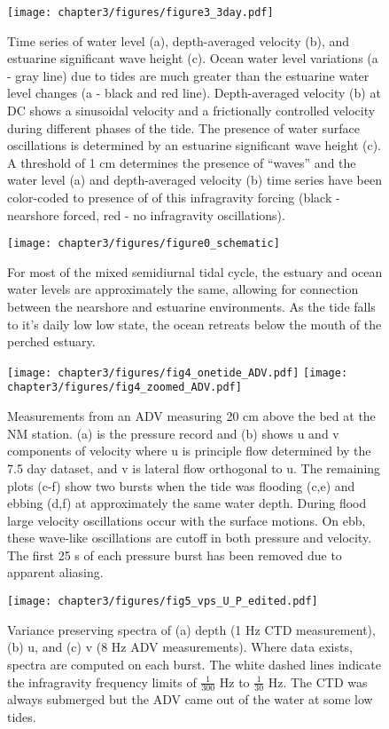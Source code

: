 \begin{figure}
\texttt{[image: chapter3/figures/figure3\_3day.pdf]}

\protect\caption{Time series of water level (a), depth-averaged velocity (b), and estuarine
significant wave height (c). Ocean water level variations (a - gray
line) due to tides are much greater than the estuarine water level
changes (a - black and red line). Depth-averaged velocity (b) at DC
shows a sinusoidal velocity and a frictionally controlled velocity
during different phases of the tide. The presence of water surface
oscillations is determined by an estuarine significant wave height
(c). A threshold of 1 cm determines the presence of ``waves'' and
the water level (a) and depth-averaged velocity (b) time series have
been color-coded to presence of of this infragravity forcing (black
- nearshore forced, red - no infragravity oscillations). \label{f3_HUHse}}
\end{figure}


\begin{figure}
\texttt{[image: chapter3/figures/figure0\_schematic]}

\protect\caption{For most of the mixed semidiurnal tidal cycle, the estuary and ocean
water levels are approximately the same, allowing for connection between
the nearshore and estuarine environments. As the tide falls to it's
daily low low state, the ocean retreats below the mouth of the perched
estuary.\label{f4_wl_schematic}}
\end{figure}

\begin{figure}
\texttt{[image: chapter3/figures/fig4\_onetide\_ADV.pdf]}
\texttt{[image: chapter3/figures/fig4\_zoomed\_ADV.pdf]}
\protect\caption{Measurements from an ADV measuring 20 cm above the bed at the NM station.
(a) is the pressure record and (b) shows u and v components of velocity
where u is principle flow determined by the 7.5 day dataset, and v
is lateral flow orthogonal to u. The remaining plots (c-f) show two
bursts when the tide was flooding (c,e) and ebbing (d,f) at approximately
the same water depth. During flood large velocity oscillations occur
with the surface motions. On ebb, these wave-like oscillations are
cutoff in both pressure and velocity. The first 25 s of each pressure
burst has been removed due to apparent aliasing. \label{f5_adv}}
\end{figure}


\begin{figure}
\texttt{[image: chapter3/figures/fig5\_vps\_U\_P\_edited.pdf]}

\protect\caption{Variance preserving spectra of (a) depth (1 Hz CTD measurement), (b)
u, and (c) v (8 Hz ADV measurements). Where data exists, spectra are
computed on each burst. The white dashed lines indicate the infragravity
frequency limits of $\frac{1}{300}$ Hz to $\frac{1}{30}$ Hz. The
CTD was always submerged but the ADV came out of the water at some
low tides. \label{f6_spectra}}
\end{figure}


